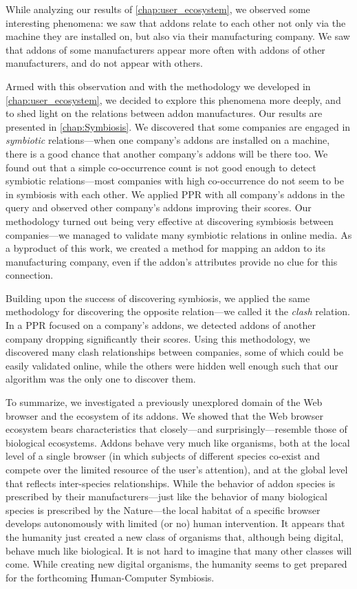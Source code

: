 \documentclass[ijoc,nonblindrev]{informs3} %
\numberwithin{equation}{subsection}
\begin{document}
While analyzing our results of \autoref{chap:user_ecosystem}, we observed some interesting phenomena: we saw that addons relate to each other not only via the machine they are installed on, but also via their manufacturing company. We saw that addons of some manufacturers appear more often with addons of other manufacturers, and do not appear with others.

Armed with this observation and with the methodology we developed in \autoref{chap:user_ecosystem}, we decided to explore this phenomena more deeply, and to shed light on the relations between addon manufactures. Our results are presented in \autoref{chap:Symbiosis}.
We discovered that some companies are engaged in \emph{symbiotic} relations---when one company's addons are installed on a machine, there is a good chance that another company's addons will be there too. We found out that a simple co-occurrence count is not good enough to detect symbiotic relations---most companies with high co-occurrence do not seem to be in symbiosis with each other. We applied PPR with all company's addons in the query and observed other company's addons improving their scores. Our methodology turned out being very effective at discovering symbiosis between companies---we managed to validate many symbiotic relations in online media. As a byproduct of this work, we created a method for mapping an addon to its manufacturing company, even if the addon's attributes provide no clue for this connection.

Building upon the success of discovering symbiosis, we applied the same methodology for discovering the opposite relation---we called it the \emph{clash} relation. In a PPR focused on a company's addons, we detected addons of another company dropping significantly their scores. Using this methodology, we discovered many clash relationships between companies, some of which could be easily validated online, while the others were hidden well enough such that our algorithm was the only one to discover them.

To summarize, we investigated a previously unexplored domain of the Web browser and the ecosystem of its addons. We showed that the Web browser ecosystem bears characteristics that closely---and surprisingly---resemble those of biological ecosystems. Addons behave very much like organisms, both at the local level of a single browser (in which subjects of different species co-exist and compete over the limited resource of the user's attention), and at the global level that reflects inter-species relationships. While the behavior of addon species is prescribed by their manufacturers---just like the behavior of many biological species is prescribed by the Nature---the local habitat of a specific browser develops autonomously with limited (or no) human intervention. It appears that the humanity just created a new class of organisms that, although being digital, behave much like biological. It is not hard to imagine that many other classes will come. While creating new digital organisms, the humanity seems to get prepared for the forthcoming Human-Computer Symbiosis.

\newpage
{} \label{Bibliography}


\end{document}
